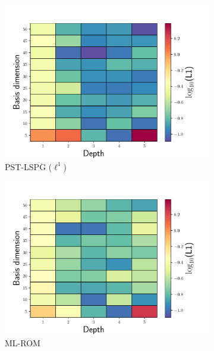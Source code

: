 \documentclass[3p,computermodern,10pt]{elsarticle}
\begin{document}
\begin{figure}
\begin{center}
\begin{subfigure}[t]{0.32\textwidth}
\includegraphics[trim={0cm 0cm 0cm 0cm},clip,width=1.0\linewidth]{code/burgers/synapse_models/basis_study/results/L1_L1.pdf}
\caption{PST-LSPG ($\ell^1$)}
\end{subfigure}
\begin{subfigure}[t]{0.32\textwidth}
\includegraphics[trim={0cm 0cm 0cm 0cm},clip,width=1.0\linewidth]{code/burgers/synapse_models/basis_study/results/L1_ML.pdf}
\caption{ML-ROM}
\end{subfigure}
\begin{subfigure}[t]{0.32\textwidth}

\end{subfigure}
\end{center}
\end{figure}
\end{document}
